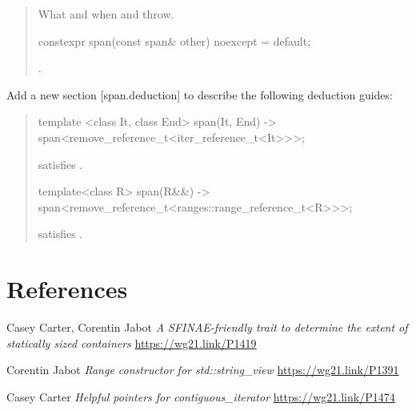 \documentclass{wg21}
\begin{document}
\begin{quote}
\begin{addedblock}
\begin{itemdescr}
    \pnum
    \throws
    What and when  and  throw.

\end{itemdescr}
\end{addedblock}

\begin{itemdecl}
constexpr span(const span& other) noexcept = default;
\end{itemdecl}
\begin{itemdescr}
    \pnum
    \ensures
    .
\end{itemdescr}

\end{quote}


Add a new section [span.deduction] to describe the following deduction guides:


\begin{quote}
\begin{addedblock}
\begin{itemdecl}
template <class It, class End>
span(It, End) -> span<remove_reference_t<iter_reference_t<It>>>;
\end{itemdecl}
\begin{itemdescr}
    \constraints
     satisfies .
\end{itemdescr}

\begin{itemdecl}
template<class R>
span(R&&) -> span<remove_reference_t<ranges::range_reference_t<R>>>;
\end{itemdecl}
\begin{itemdescr}
    \constraints {} satisfies .
\end{itemdescr}


\end{addedblock}

\end{quote}

\section{References}
\renewcommand{\section}[2]{}%
\begin{thebibliography}{9}

    Casey Carter, Corentin Jabot
    \emph{A SFINAE-friendly trait to determine the extent of statically sized containers}\newline
    \url{https://wg21.link/P1419}

    Corentin Jabot
    \emph{Range constructor for std::string\_view}\newline
    \url{https://wg21.link/P1391}


    Casey Carter
    \emph{Helpful pointers for contiguous_iterator}\newline
    \url{https://wg21.link/P1474}


\end{thebibliography}
\end{document}
